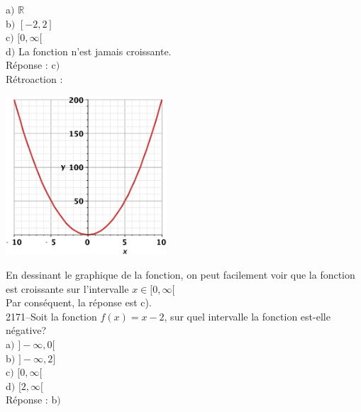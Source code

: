 \documentclass[letterpaper, 12pt]{article}
\begin{document}
a$)$ $\mathbb{R}$\\
b$)$ $[-2,2]$ \\
c$)$ $[0,\infty[$\\
d$)$ La fonction n'est jamais croissante.\\

R\'eponse : c$)$\\

R\'etroaction :\\
\begin{center}
 \includegraphics[width=6cm,bb=20 118 575 673]{Q2170.eps}
\end{center}
En dessinant le graphique de la fonction, on peut facilement voir que la fonction est croissante sur l'intervalle  $x\in[0,\infty[$\\
Par cons\'equent, la r\'eponse est c).\\

2171--Soit la fonction $f(x)=x-2$, sur quel intervalle la fonction est-elle n\'egative? \\

a$)$ $]-\infty,0[$\\
b$)$ $]-\infty,2]$ \\
c$)$ $[0,\infty[$\\
d$)$ $[2,\infty[$\\

R\'eponse : b$)$\\
\end{document}
